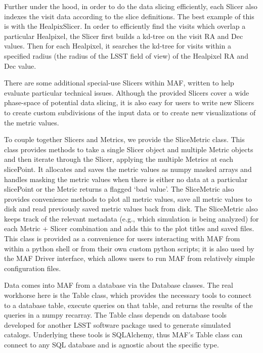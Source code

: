 \documentclass[]{spie}  %
\begin{document}
Further under the hood, in order to do the data slicing efficiently,
each Slicer also indexes the visit data according to the slice
definitions. The best example of this is with the HealpixSlicer. In
order to efficiently find the visits which overlap a particular
Healpixel, the Slicer first builds a kd-tree on the visit RA and Dec
values. Then for each Healpixel, it searches the kd-tree for visits
within a specified radius (the radius of the LSST field of view) of
the Healpixel RA and Dec value. 

There are some additional special-use Slicers within MAF, written to
help evaluate particular technical issues. Although the provided
Slicers cover a wide phase-space of potential data slicing, it is
also easy for users to write new Slicers to create custom subdivisions
of the input data or to create new visualizations of the metric
values. 

To couple together Slicers and Metrics, we provide
the SliceMetric class. This class provides methods to take a single
Slicer object and multiple Metric objects and then iterate through the
Slicer, applying the multiple Metrics at each slicePoint. It allocates
and saves the metric values as numpy masked arrays and handles masking
the metric values when there is either no data at a particular
slicePoint or the Metric returns a flagged `bad value'. The
SliceMetric also provides convenience methods to plot all metric values,
save all metric values to disk and read previously saved metric values
back from disk. The SliceMetric also keeps track of the relevant
metadata (e.g., which simulation is being analyzed) for each Metric + Slicer combination and adds this to the
plot titles and saved files. This class is provided as a convenience
for users interacting with MAF from within a python shell or from
their own custom python scripts; it is also used by the MAF Driver
interface, which allows users to run MAF from relatively simple
configuration files.

Data comes into MAF from a database via the Database classes. The real
workhorse here is the Table class, which provides the necessary tools
to connect to a database table, execute queries on that table, and
returns the results of the queries in a numpy recarray. The Table
class depends on database tools developed for another LSST software
package used to generate simulated catalogs. Underlying
these tools is SQLAlchemy\cite{sqlalchemy}, thus MAF's Table class can connect to any
SQL database and is agnostic about the specific type.
\end{document}
